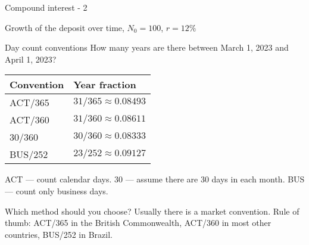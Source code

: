 \documentclass{beamer}
\begin{document}
\begin{frame}{Compound interest - 2}

	\centering
	\scriptsize{Growth of the deposit over time, $N_0=100$, $r=12\%$}
\end{frame}



\begin{frame}{Day count conventions}
\justify
How many years are there between March 1, 2023 and April 1, 2023?

\justify
\centering
\begin{tabular}{l|l}
Convention & Year fraction \\ \hline
ACT/365 & $31/365 \approx 0.08493$ \\
ACT/360 & $31/360 \approx 0.08611$ \\
30/360  & $30/360 \approx 0.08333$ \\
BUS/252 & $23/252 \approx 0.09127$ 
\end{tabular}

\justify
ACT --- count calendar days. 30 --- assume there are 30 days in each month. BUS --- count only business days.

\justify
Which method should you choose? Usually there is a market convention. Rule of thumb: ACT/365 in the British Commonwealth, ACT/360 in most other countries, BUS/252 in Brazil. 
\end{frame}
\end{document}
